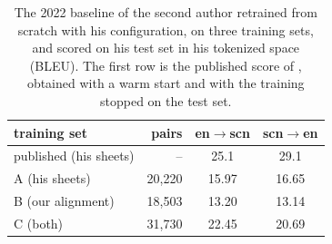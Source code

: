 \begin{table}[t]
\caption{The 2022 baseline of the second author retrained from scratch with his configuration,
on three training sets, and scored on his test set in his tokenized space (BLEU). The first row
is the published score of \citet{wdowiak2022loresnmt}, obtained with a warm start and with the
training stopped on the test set.}
\label{tab:recipe}
\centering
\begin{tabular}{lrcc}
\toprule
training set & pairs & en$\rightarrow$scn & scn$\rightarrow$en \\
\midrule
published (his sheets) & -- & 25.1 & 29.1 \\
A (his sheets) & 20{,}220 & 15.97 & 16.65 \\
B (our alignment) & 18{,}503 & 13.20 & 13.14 \\
C (both) & 31{,}730 & 22.45 & 20.69 \\
\bottomrule
\end{tabular}
\end{table}
